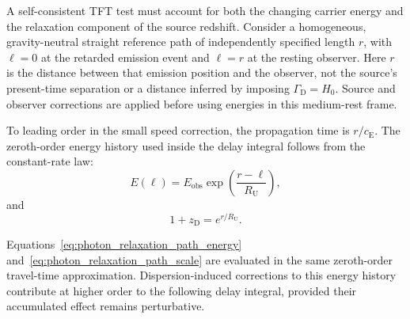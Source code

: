A self-consistent TFT test must account for both the changing carrier energy
and the relaxation component of the source redshift. Consider a homogeneous,
gravity-neutral straight reference path of independently specified length
\(r\), with \(\ell=0\) at the retarded emission event and \(\ell=r\) at the
resting observer. Here \(r\) is the distance between that emission position
and the observer, not the source's present-time separation or a distance
inferred by imposing \(\Gamma_{\mathrm D}=H_0\). Source and observer
corrections are applied before using energies in this medium-rest frame.

To leading order in the small speed correction, the propagation time is
\(r/c_{\mathrm E}\). The zeroth-order energy history used inside the delay
integral follows from the constant-rate law:
\begin{equation}
    E(\ell)
    =
    E_{\mathrm{obs}}
    \exp
    \left(
        \frac{
            r-\ell
        }{
            R_{\mathrm U}
        }
    \right),
    \label{eq:photon_relaxation_path_energy}
\end{equation}
and
\begin{equation}
    1+z_{\mathrm D}
    =
    e^{r/R_{\mathrm U}}.
    \label{eq:photon_relaxation_path_scale}
\end{equation}

Equations~\eqref{eq:photon_relaxation_path_energy}
and~\eqref{eq:photon_relaxation_path_scale} are evaluated in the same
zeroth-order travel-time approximation. Dispersion-induced corrections to
this energy history contribute at higher order to the following delay
integral, provided their accumulated effect remains perturbative.

